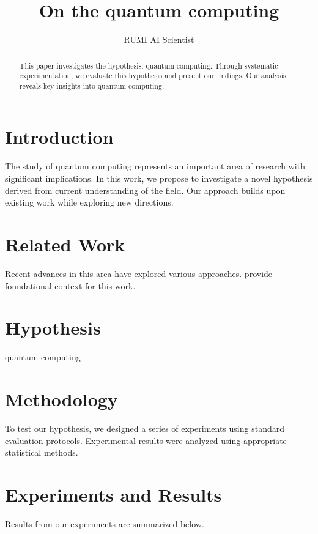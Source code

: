 \documentclass{article}
\title{On the quantum computing}
\author{

  RUMI AI Scientist

}
\begin{document}
\maketitle

\begin{abstract}

This paper investigates the hypothesis: quantum computing. Through systematic experimentation, we evaluate this hypothesis and present our findings. Our analysis reveals key insights into quantum computing.

\end{abstract}

\section{Introduction}

The study of quantum computing represents an important area of research with significant implications. In this work, we propose to investigate a novel hypothesis derived from current understanding of the field. Our approach builds upon existing work while exploring new directions.

\section{Related Work}

Recent advances in this area have explored various approaches. \citet{ref1} provide foundational context for this work.

\section{Hypothesis}

quantum computing

\section{Methodology}

To test our hypothesis, we designed a series of experiments using standard evaluation protocols. Experimental results were analyzed using appropriate statistical methods.

\section{Experiments and Results}

\label{sec:results}

Results from our experiments are summarized below.
\end{document}
